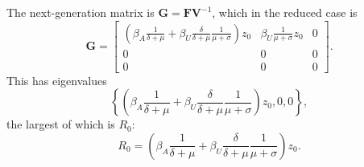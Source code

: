 \documentclass{article}
\newcommand{\mat}[1]{\mathbf{#1}}
\begin{document}
The next-generation matrix is $\mat{G} = \mat{F} \mat{V}^{-1}$, which
in the reduced case is
\begin{equation}
  \mat{G} =
  \begin{bmatrix}
    \left(\beta_A \frac{1}{\delta + \mu}
      + \beta_U \frac{\delta}{\delta + \mu}
      \frac{1}{\mu + \sigma}\right)
    z_0
    & 
    \beta_U \frac{1}{\mu + \sigma} z_0
    &
    0
    \\
    0 & 0 & 0
    \\
    0 & 0 & 0
  \end{bmatrix}.
\end{equation}
This has eigenvalues
\begin{equation}
  \left\{\left(\beta_A \frac{1}{\delta + \mu}
      + \beta_U \frac{\delta}{\delta + \mu}
      \frac{1}{\mu + \sigma}\right)
    z_0, 0, 0
  \right\},
\end{equation}
the largest of which is $R_0$:
\begin{equation}
  R_0 = \left(\beta_A \frac{1}{\delta + \mu}
    + \beta_U \frac{\delta}{\delta + \mu}
    \frac{1}{\mu + \sigma}\right)
  z_0.
\end{equation}
\end{document}
